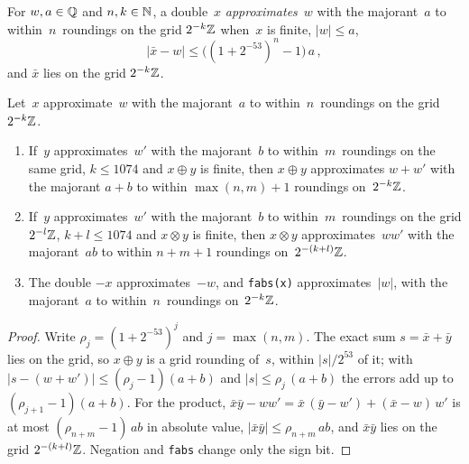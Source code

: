 \begin{definition}[Approximations]\label{def:Double.Approx}
  \leanok
  For $w, a \in \mathbb{Q}$ and $n, k \in \mathbb{N}$, a double~$x$ \emph{approximates}~$w$ with the
  majorant~$a$ to within~$n$~roundings on the grid $2^{-k}\mathbb{Z}$ when~$x$ is finite, $|w| \le a$,
  \[ |\bar x - w| \le \bigl((1 + 2^{-53})^n - 1\bigr)\,a\,, \]
  and $\bar x$ lies on the grid $2^{-k}\mathbb{Z}$.
\end{definition}

\begin{lemma}\label{lem:Double.Approx.add}
  \leanok
  Let~$x$ approximate~$w$ with the majorant~$a$ to within~$n$~roundings on the grid $2^{-k}\mathbb{Z}$.
  \begin{enumerate}
    \item If~$y$ approximates~$w'$ with the majorant~$b$ to within~$m$~roundings on the same grid,
      $k \le 1074$ and $x \oplus y$ is finite, then $x \oplus y$ approximates $w + w'$ with the
      majorant $a + b$ to within $\max(n, m) + 1$ roundings on~$2^{-k}\mathbb{Z}$.
    \item If~$y$ approximates~$w'$ with the majorant~$b$ to within~$m$~roundings on the grid
      $2^{-l}\mathbb{Z}$, $k + l \le 1074$ and $x \otimes y$ is finite, then $x \otimes y$
      approximates~$w w'$ with the majorant~$ab$ to within $n + m + 1$ roundings
      on~$2^{-(k + l)}\mathbb{Z}$.
    \item The double $-x$ approximates~$-w$, and \texttt{fabs(x)} approximates~$|w|$, with the
      majorant~$a$ to within~$n$~roundings on~$2^{-k}\mathbb{Z}$.
  \end{enumerate}
\end{lemma}

\begin{proof}
  \leanok
  Write $\rho_j = (1 + 2^{-53})^j$ and $j = \max(n, m)$. The exact sum $s = \bar x + \bar y$ lies on
  the grid, so $x \oplus y$ is a grid rounding of~$s$, within $|s|/2^{53}$ of it; with
  $|s - (w + w')| \le (\rho_j - 1)(a + b)$ and $|s| \le \rho_j\,(a + b)$ the errors add up to
  $(\rho_{j+1} - 1)(a + b)$. For the product,
  $\bar x \bar y - w w' = \bar x\,(\bar y - w') + (\bar x - w)\,w'$ is at most
  $(\rho_{n+m} - 1)\,ab$ in absolute value, $|\bar x \bar y| \le \rho_{n+m}\,ab$, and
  $\bar x \bar y$ lies on the grid $2^{-(k+l)}\mathbb{Z}$. Negation and \texttt{fabs} change only the sign
  bit.
\end{proof}

